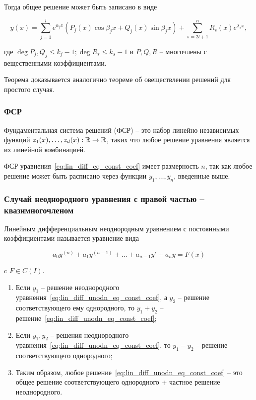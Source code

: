 Тогда общее решение может быть записано в виде

\begin{equation*}
    y(x) = \sum_{j=1}^l e^{\alpha_j x} \left(P_j (x) \cos{\beta_j x} + Q_j(x) \sin{\beta_j x} \right) + \sum_{s = 2l+1}^n R_s(x) e^{\lambda_s x},
\end{equation*}

где $\deg P_j, Q_j \leq k_j - 1; \deg R_s \leq k_s - 1$ и $P, Q, R$ -- многочлены с вещественными коэффициентами.

Теорема доказывается аналогично теореме об овеществлении решений для простого случая.

\subsubsection{ФСР}

\Def Фундаментальная система решений (ФСР) -- это набор линейно независимых функций $z_1(x), \dots, z_d(x): \mathbb{R} \rightarrow \mathbb{R}$, таких что любое решение уравнения является их линейной комбинацией.

\Statement ФСР уравнения~\ref{eq:lin_diff_eq_const_coef} имеет размерность $n$, так как любое решение может быть расписано через функции $y_1, \dots, y_n$, введенные выше.

\subsubsection{Случай неоднородного уравнения с правой частью -- квазимногочленом}

\Def Линейным дифференциальным неоднородным уравнением с постоянными коэффициентами называется уравнение вида

\begin{equation}
    a_0 y^{(n)} + a_1 y^{(n-1)} + \dots + a_{n-1} y' + a_n y = F(x)
    \label{eq:lin_diff_unodn_eq_const_coef}
\end{equation}

c $F \in C(I)$.

\Note
\begin{enumerate}
    \item Если $y_1$ -- решение неоднородного уравнения~\ref{eq:lin_diff_unodn_eq_const_coef}, а $y_2$ -- решение соответствующего ему однородного, то $y_1+y_2$ -- решение~\ref{eq:lin_diff_unodn_eq_const_coef};
    \item Если $y_1, y_2$ -- решения неоднородного уравнения~\ref{eq:lin_diff_unodn_eq_const_coef}, то $y_1-y_2$ -- решение соответствующего однородного;
    \item Таким образом, любое решение~\ref{eq:lin_diff_unodn_eq_const_coef} -- это общее решение соответствующего однородного + частное решение неоднородного.
\end{enumerate}

